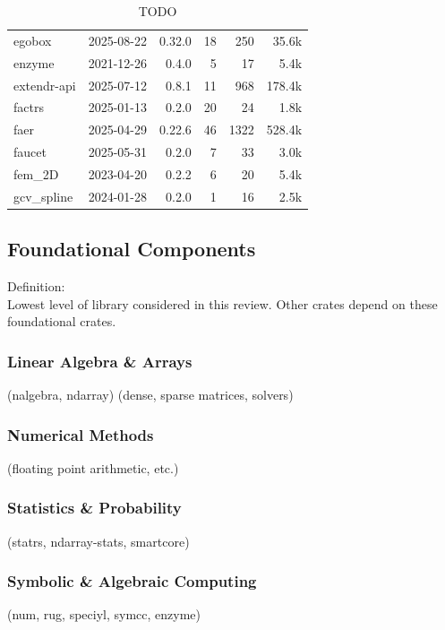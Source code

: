 \documentclass{article}
\begin{document}
\begin{table}
\begin{tabular}{l r r r r r}
        egobox           &2025-08-22 &0.32.0     &18   &250      &     35.6k\\
        enzyme           &2021-12-26 &0.4.0      &5    &17       &      5.4k\\
        extendr-api      &2025-07-12 &0.8.1      &11   &968      &    178.4k\\
        factrs           &2025-01-13 &0.2.0      &20   &24       &      1.8k\\
        faer             &2025-04-29 &0.22.6     &46   &1322     &    528.4k\\
        faucet           &2025-05-31 &0.2.0      &7    &33       &      3.0k\\
        fem\_2D          &2023-04-20 &0.2.2      &6    &20       &      5.4k\\
        gcv\_spline      &2024-01-28 &0.2.0      &1    &16       &      2.5k\\
        \bottomrule
    \end{tabular}
    \caption{TODO}
\end{table}

\subsection{Foundational Components}
Definition:\\
Lowest level of library considered in this review. Other crates depend on these
foundational crates.

\subsubsection{Linear Algebra \& Arrays}
(nalgebra, ndarray) (dense, sparse matrices, solvers)

\subsubsection{Numerical Methods}
(floating point arithmetic, etc.)

\subsubsection{Statistics \& Probability}
(statrs, ndarray-stats, smartcore)

\subsubsection{Symbolic \& Algebraic Computing}
(num, rug, speciyl, symcc, enzyme)
\end{document}
